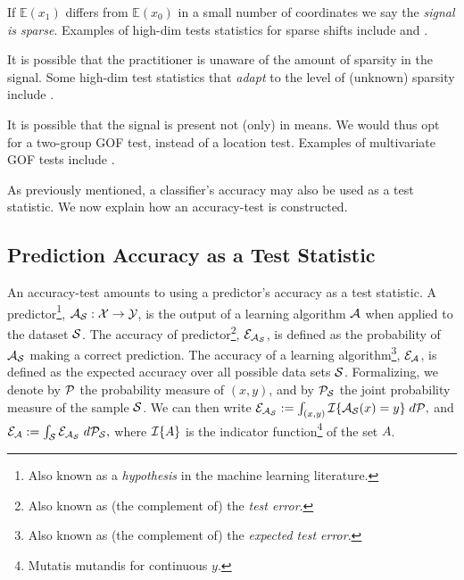 \documentclass[]{bio}
\begin{document}
If $\mathbb{E}(x_1)$ differs from $\mathbb{E}(x_0)$ in a small number of coordinates we say the \emph{signal is sparse}.
Examples of high-dim tests statistics for sparse shifts include \cite{cai_two-sample_2013} and \cite{chang2014simulation}.

It is possible that the practitioner is unaware of the amount of sparsity in the signal. 
Some high-dim test statistics that \emph{adapt} to the level of (unknown) sparsity include \cite{simes1986improved,donoho2004higher,zhong2013tests,shen2015adaptive,moscovich2016exact}.

It is possible that the signal is present not (only) in means. 
We would thus opt for a two-group GOF test, instead of a location test. 
Examples of multivariate GOF tests include \cite{bickel1969distribution,friedman1979multivariate,hall2002permutation,szekely2004testing,Biau2005,Rosenbaum2005,eric2008testing,perez2009estimation,vayatis_auc_2009,gretton_kernel_2012-1}.

As previously mentioned, a classifier's accuracy may also be used as a test statistic. 
We now explain how an accuracy-test is constructed. 


\subsection{Prediction Accuracy as a Test Statistic}
An accuracy-test amounts to using a predictor's accuracy as a test statistic.  
A predictor\footnote{Also known as a \emph{hypothesis} in the machine learning literature.}, $\mathcal{A}_{\mathcal{S}}:\mathcal{X} \to \mathcal{Y}$, is the output of a learning algorithm $\mathcal{A}$ when applied to the dataset $\mathcal{S}$. 
The accuracy of predictor\footnote{Also known as (the complement of) the \emph{test error}.}, $\mathcal{E}_{\mathcal{A}_{\mathcal{S}}}$, is defined as the probability of $\mathcal{A}_{\mathcal{S}}$ making a correct prediction. 
The accuracy of a learning algorithm\footnote{Also known  as (the complement of) the \emph{expected test error}.}, $\mathcal{E}_{\mathcal{A}}$, is defined as the expected accuracy over all possible data sets $\mathcal{S}$. 
Formalizing, we denote by $\mathcal{P}$ the probability measure of $(x, y)$, and by $\mathcal{P}_{\mathcal{S}}$ the joint probability measure of the sample $\mathcal{S}$. 
We can then write $\mathcal{E}_{\mathcal{A}_{\mathcal{S}}}:=\int_{(x,y)} \mathcal{I}{\{ \mathcal{A}_{\mathcal{S}}(x)=y \}} \; d\mathcal{P},$
and
$\mathcal{E}_{\mathcal{A}}:=\int_{\mathcal{S}} \mathcal{E}_{\mathcal{A}_{\mathcal{S}}} \; d\mathcal{P}_{\mathcal{S}},$
where $\mathcal{I}{\{ A \}}$ is the indicator function\footnote{Mutatis mutandis for continuous $y$.} of the set $A$. 
\end{document}
